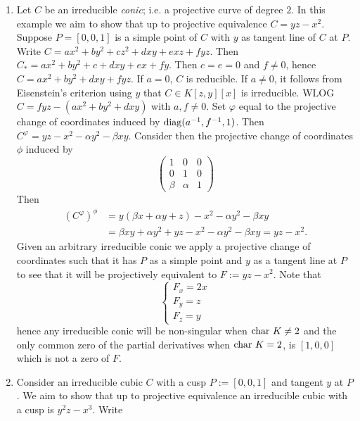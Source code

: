     \begin{example}\label{ClassifyingCertainCurves}
        \begin{enumerate}
            \item Let $C$ be an irreducible \textit{conic}; i.e. a projective curve of degree $2$. In this example we aim to show that up to projective equivalence $C=yz-x^2$. Suppose $P=[0,0,1]$ is a simple point of $C$ with $y$ as tangent line of $C$ at $P$. Write $C=ax^2+by^2+cz^2+dxy+exz+fyz$. Then $C_\ast = ax^2+by^2+c +dxy+ex+fy$. Then $c=e=0$ and $f\neq 0$, hence $C=ax^2+by^2+dxy+fyz$. If $a=0$, $C$ is reducible. If $a\neq 0$, it follows from Eisenstein's criterion using $y$ that $C\in K[z,y][x]$ is irreducible. WLOG $C=fyz-(ax^2+by^2+dxy)$ with $a,f\neq 0$. Set $\varphi$ equal to the projective change of coordinates induced by $\mathrm{diag}(a^{-1},f^{-1},1)$. Then $C^\varphi = yz-x^2-\alpha y^2-\beta xy$. Consider then the projective change of coordinates $\phi$ induced by 
            $$
                \begin{pmatrix}
                    1 & 0 & 0\\
                    0 & 1 &0\\
                    \beta & \alpha & 1
                \end{pmatrix}
            $$
            Then 
            \begin{align*}
                (C^\varphi)^\phi &= y(\beta x+\alpha y+z)-x^2-\alpha y^2-\beta xy\\ 
                &= \beta xy+\alpha y^2+yz-x^2-\alpha y^2-\beta xy = yz-x^2. 
            \end{align*}
            Given an arbitrary irreducible conic we apply a projective change of coordinates such that it has $P$ as a simple point and $y$ as a tangent line at $P$ to see that it will be projectively equivalent to $F:=yz-x^2$. Note that 
            $$
                \begin{cases}
                    F_x = 2x\\
                    F_y = z\\
                    F_z = y
                \end{cases}
            $$
            hence any irreducible conic will be non-singular when $\mathrm{char} \ K \neq 2$ and the only common zero of the partial derivatives when $\mathrm{char}\ K = 2$, is $[1,0,0]$ which is not a zero of $F$.
            \item Consider an irreducible cubic $C$ with a cusp $P:=[0,0,1]$ and tangent $y$ at $P$. We aim to show that up to projective equivalence an irreducible cubic with a cusp is $y^2z-x^3$. Write 

\end{enumerate}
\end{example}
